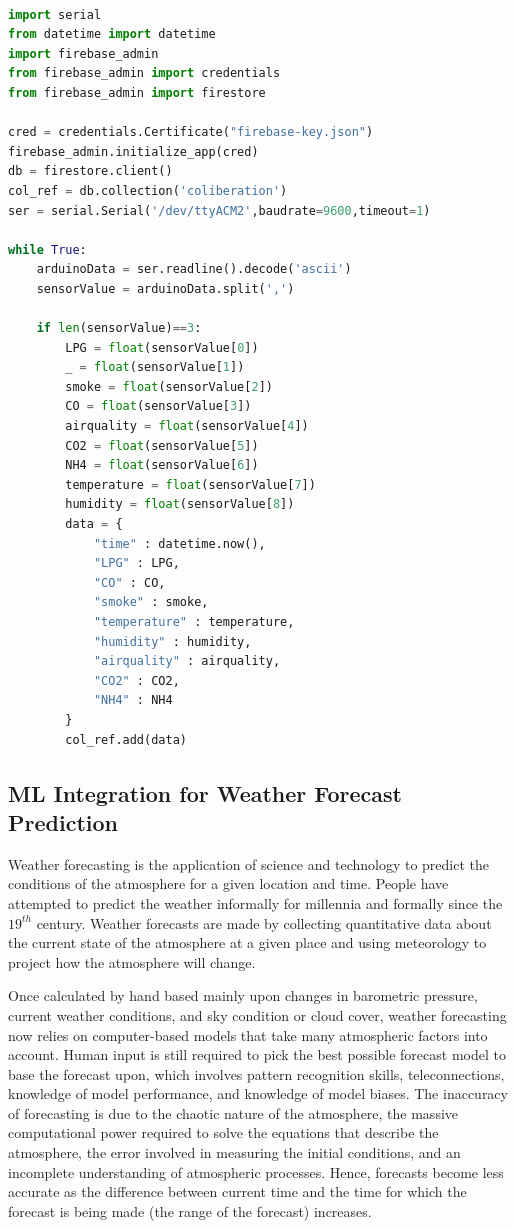 \begin{lstlisting}[language=Python, caption= Data calibration from Arduino Serial port]

import serial
from datetime import datetime
import firebase_admin
from firebase_admin import credentials
from firebase_admin import firestore

cred = credentials.Certificate("firebase-key.json")
firebase_admin.initialize_app(cred)
db = firestore.client()
col_ref = db.collection('coliberation')
ser = serial.Serial('/dev/ttyACM2',baudrate=9600,timeout=1)

while True:
    arduinoData = ser.readline().decode('ascii')
    sensorValue = arduinoData.split(',')

    if len(sensorValue)==3:
        LPG = float(sensorValue[0])
        _ = float(sensorValue[1])
        smoke = float(sensorValue[2])
        CO = float(sensorValue[3])
        airquality = float(sensorValue[4])
        CO2 = float(sensorValue[5])
        NH4 = float(sensorValue[6])
        temperature = float(sensorValue[7])
        humidity = float(sensorValue[8])
        data = {
            "time" : datetime.now(),
            "LPG" : LPG,
            "CO" : CO,
            "smoke" : smoke,
            "temperature" : temperature,
            "humidity" : humidity,
            "airquality" : airquality,
            "CO2" : CO2,
            "NH4" : NH4 
        }
        col_ref.add(data)
\end{lstlisting}

\subsection{ML Integration for Weather Forecast Prediction}

Weather forecasting is the application of science and technology to predict the conditions of the atmosphere for a given location and time. People have attempted to predict the weather informally for millennia and formally since the $19^{th}$ century. Weather forecasts are made by collecting quantitative data about the current state of the atmosphere at a given place and using meteorology to project how the atmosphere will change.

Once calculated by hand based mainly upon changes in barometric pressure, current weather conditions, and sky condition or cloud cover, weather forecasting now relies on computer-based models that take many atmospheric factors into account. Human input is still required to pick the best possible forecast model to base the forecast upon, which involves pattern recognition skills, teleconnections, knowledge of model performance, and knowledge of model biases. The inaccuracy of forecasting is due to the chaotic nature of the atmosphere, the massive computational power required to solve the equations that describe the atmosphere, the error involved in measuring the initial conditions, and an incomplete understanding of atmospheric processes. Hence, forecasts become less accurate as the difference between current time and the time for which the forecast is being made (the range of the forecast) increases. 

